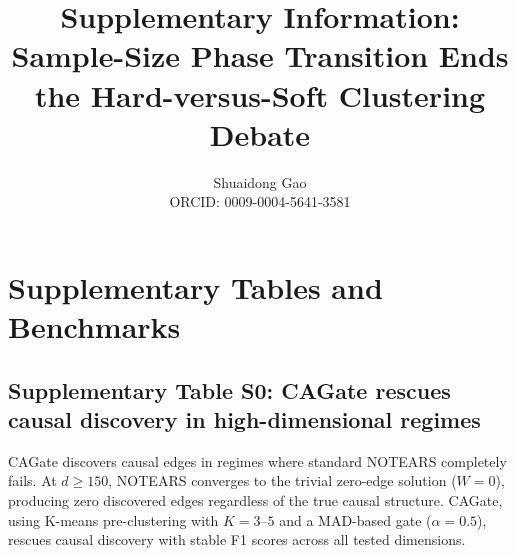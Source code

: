 \documentclass[12pt,a4paper]{article}
\title{Supplementary Information:\\Sample-Size Phase Transition Ends the Hard-versus-Soft Clustering Debate}
\author{Shuaidong Gao\\ORCID: 0009-0004-5641-3581}
\date{}
\begin{document}
\maketitle
\tableofcontents
\newpage

\section{Supplementary Tables and Benchmarks}

\subsection{Supplementary Table S0: CAGate rescues causal discovery in high-dimensional regimes}
\label{sec:ext1}

CAGate discovers causal edges in regimes where standard NOTEARS completely fails.
At $d \geq 150$, NOTEARS converges to the trivial zero-edge solution ($W = 0$),
producing zero discovered edges regardless of the true causal structure.
CAGate, using K-means pre-clustering with $K = 3$--$5$ and a MAD-based gate
($\alpha = 0.5$), rescues causal discovery with stable F1 scores across all tested
dimensions.
\end{document}
